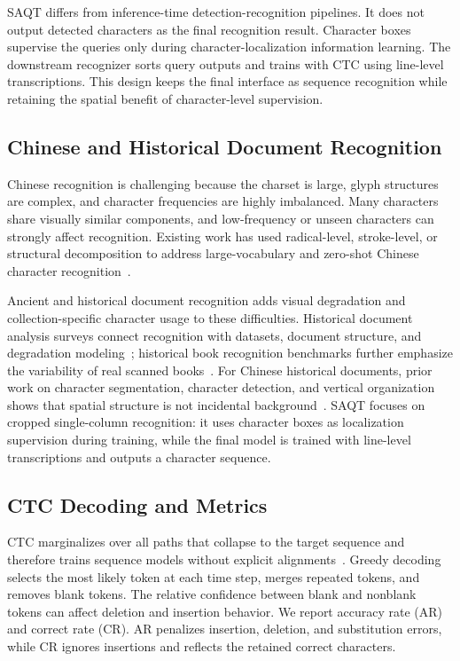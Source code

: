 SAQT differs from inference-time detection-recognition pipelines. It does not output detected characters as the final recognition result. Character boxes supervise the queries only during character-localization information learning. The downstream recognizer sorts query outputs and trains with CTC using line-level transcriptions. This design keeps the final interface as sequence recognition while retaining the spatial benefit of character-level supervision.

\subsection{Chinese and Historical Document Recognition}

Chinese recognition is challenging because the charset is large, glyph structures are complex, and character frequencies are highly imbalanced. Many characters share visually similar components, and low-frequency or unseen characters can strongly affect recognition. Existing work has used radical-level, stroke-level, or structural decomposition to address large-vocabulary and zero-shot Chinese character recognition~\cite{diao2023rzcr,zeng2022star}.

Ancient and historical document recognition adds visual degradation and collection-specific character usage to these difficulties. Historical document analysis surveys connect recognition with datasets, document structure, and degradation modeling~\cite{lombardi2020historicalsurvey}; historical book recognition benchmarks further emphasize the variability of real scanned books~\cite{antonacopoulos2013hbr}. For Chinese historical documents, prior work on character segmentation, character detection, and vertical organization shows that spatial structure is not incidental background~\cite{tang2020hrcenternet,wu2020precise,ma2024reading}. SAQT focuses on cropped single-column recognition: it uses character boxes as localization supervision during training, while the final model is trained with line-level transcriptions and outputs a character sequence.

\subsection{CTC Decoding and Metrics}

CTC marginalizes over all paths that collapse to the target sequence and therefore trains sequence models without explicit alignments~\cite{graves2006ctc}. Greedy decoding selects the most likely token at each time step, merges repeated tokens, and removes blank tokens. The relative confidence between blank and nonblank tokens can affect deletion and insertion behavior. We report accuracy rate (AR) and correct rate (CR). AR penalizes insertion, deletion, and substitution errors, while CR ignores insertions and reflects the retained correct characters.
